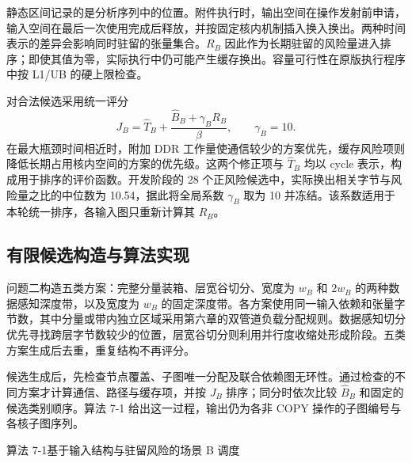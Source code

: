 静态区间记录的是分析序列中的位置。附件执行时，输出空间在操作发射前申请，输入空间在最后一次使用完成后释放，并按固定核内机制插入换入换出。两种时间表示的差异会影响同时驻留的张量集合。$R_B$ 因此作为长期驻留的风险量进入排序；即使其值为零，实际执行中仍可能产生缓存换出。容量可行性在原版执行程序中按 L1/UB 的硬上限检查。

对合法候选采用统一评分
\begin{equation}
J_B=\widehat T_B+\frac{\widehat B_B+\gamma_B R_B}{\beta},\qquad \gamma_B=10.
\label{eq:q2-score}
\end{equation}
在最大瓶颈时间相近时，附加 DDR 工作量使通信较少的方案优先，缓存风险项则降低长期占用核内空间的方案的优先级。这两个修正项与 $\widehat T_B$ 均以 cycle 表示，构成用于排序的评价函数。开发阶段的 28 个正风险候选中，实际换出相关字节与风险量之比的中位数为 10.54，据此将全局系数 $\gamma_B$ 取为 10 并冻结。该系数适用于本轮统一排序，各输入图只重新计算其 $R_B$。

\subsection{有限候选构造与算法实现}
问题二构造五类方案：完整分量装箱、层宽谷切分、宽度为 $w_B$ 和 $2w_B$ 的两种数据感知深度带，以及宽度为 $w_B$ 的固定深度带。各方案使用同一输入依赖和张量字节数，其中分量或带内独立区域采用第六章的双管道负载分配规则。数据感知切分优先寻找跨层字节数较少的位置，层宽谷切分则利用并行度收缩处形成阶段。五类方案生成后去重，重复结构不再评分。

候选生成后，先检查节点覆盖、子图唯一分配及联合依赖图无环性。通过检查的不同方案才计算通信、路径与缓存项，并按 $J_B$ 排序；同分时依次比较 $\widehat B_B$ 和固定的候选类别顺序。算法 7-1 给出这一过程，输出仍为各非 COPY 操作的子图编号与各核子图序列。

\begin{algorithmblock}{算法 7-1\quad 基于输入结构与驻留风险的场景 B 调度}
\end{algorithmblock}

